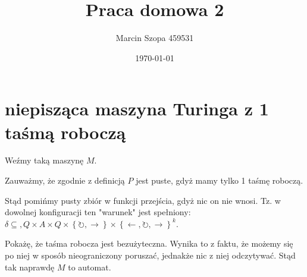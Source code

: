\documentclass{article}
\title{Praca domowa 2}
\author{Marcin Szopa 459531}
\date{\today}
\theoremstyle{definition}
\theoremstyle{remark}
\begin{document}
\maketitle

\section{niepisząca maszyna Turinga z 1 taśmą roboczą}

Weźmy taką maszynę \(M\).

Zauważmy, że zgodnie z definicją \(P\) jest puste, gdyż mamy tylko 1 taśmę roboczą.

Stąd pomińmy pusty zbiór w funkcji przejścia, gdyż nic on nie wnosi. Tz. w dowolnej konfiguracji ten "warunek" jest spełniony: \(\delta \subseteq, Q \times A \times Q \times \left\{ \circlearrowright,  \rightarrow  \right\} \times \left\{ \leftarrow, \circlearrowright,  \rightarrow  \right\}^k\).

Pokażę, że taśma robocza jest bezużyteczna. Wynika to z faktu, że możemy się po niej w sposób nieograniczony poruszać, jednakże nic z niej odczytywać. Stąd tak naprawdę \(M\) to automat.
\end{document}

